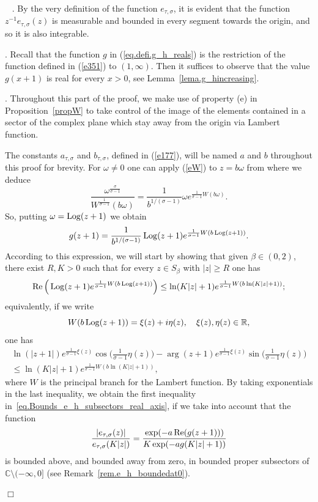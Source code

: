 \documentclass[12pt,leqno]{amsart}
\newcommand{\R}{\mathbb{R}}
\def\C{\mathbb{C}}
\theoremstyle{plain}
\theoremstyle{definition}
\numberwithin{equation}{section}
\def\Log{\mathop{\rm Log}\nolimits}
\def\Re{\mathop{\rm Re}\nolimits}      %
\newenvironment{proof1}{\medskip\par\noindent{\bf Proof}\ \normalfont}{\hfill $\Box$
\medskip\par}
\begin{document}
\begin{proof1}
. By the very definition of the function $e_{\tau,\sigma}$, it is evident that the function $z^{-1}e_{\tau,\sigma}(z)$ is measurable and bounded in every segment towards the origin, and so it is also integrable.

. Recall that the function $g$ in (\ref{eq.defi.g_h_reals})  is the restriction of the function defined in (\ref{e351}) to $(1,\infty)$. Then it suffices to observe that the value $g(x+1)$ is real for every $x>0$, see Lemma~\ref{lema.g_hincreasing}.

. Throughout this part of the proof, we make use of property (e) in Proposition~\ref{propW} to take control of the image of the elements contained in a sector of the complex plane which stay away from the origin via Lambert function.



 The constants $a_{\tau,\sigma}$ and $b_{\tau,\sigma}$, defined in (\ref{e177}), will be named $a$ and $b$ throughout this proof for brevity.
For $\omega\neq 0$ one can apply (\ref{eW}) to $z=b\omega$ from where we deduce
$$
\frac{\omega^{\frac{\sigma}{\sigma-1}}}{W^{\frac{1}{\sigma-1}}(b\omega)}=
\frac{1}{b^{1/(\sigma-1)}}\omega e^{\frac{1}{\sigma-1}W(b\omega)}.
$$
So, putting $\omega=\Log(z+1)$ we obtain
$$
g(z+1)=\frac{1}{b^{1/(\sigma-1)}}\Log(z+1) e^{\frac{1}{\sigma-1}W(b\Log(z+1))}.
$$
According to this expression, we will start by showing that given $\beta\in(0,2)$, there exist $R,K>0$ such that for every $z\in S_{\beta}$ with $|z|\ge R$ one has
$$
\Re\Big(\Log(z+1) e^{\frac{1}{\sigma-1}W(b\Log(z+1))}\Big)\le
\ln(K|z|+1) e^{\frac{1}{\sigma-1}W(b\ln(K|z|+1))};
$$
equivalently, if we write
\begin{equation}\label{eq.RealImaginaryPartsLambert}
W(b\Log(z+1))=\xi(z)+i\eta(z),\quad \xi(z),\eta(z)\in\R,
\end{equation}
one has
\begin{multline}\label{eq.IneqFineAdjustComplexLambert}
\ln(|z+1|) e^{\frac{1}{\sigma-1}\xi(z)} \cos\big(\frac{1}{\sigma-1}\eta(z)\big)-
\arg(z+1)e^{\frac{1}{\sigma-1}\xi(z)} \sin\big(\frac{1}{\sigma-1}\eta(z)\big)\\
\le
\ln(K|z|+1) e^{\frac{1}{\sigma-1}W(b\ln(K|z|+1))},
\end{multline}
where $W$ is the principal branch for the Lambert function. By taking exponentials in the last inequality, we obtain the first inequality in~\eqref{eq.Bounds_e_h_subsectors_real_axis}, if we take into account that the function
$$
\frac{|e_{\tau,\sigma}(z)|}{e_{\tau,\sigma}(K|z|)}= \frac{\exp(-a\Re(g(z+1)))}{K\exp(-ag(K|z|+1))}
$$
is bounded above, and bounded away from zero, in bounded proper subsectors of $\C\setminus(-\infty,0]$ (see Remark~\ref{rem.e_h_boundedat0}).


\end{proof1}
\end{document}
